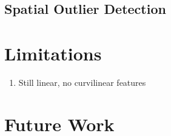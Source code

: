 \subsection{Spatial Outlier Detection}
\label{subsec:07outlier}


\FloatBarrier
\section{Limitations}
\label{sec:07limit}

\begin{enumerate}
    \item Still linear, no curvilinear features
\end{enumerate}



\FloatBarrier
\section{Future Work}
\label{sec:07fwork}

